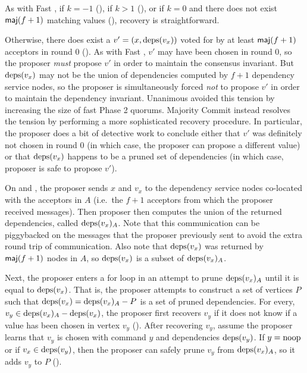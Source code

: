 As with Fast \BPaxos{}, if $k = -1$ (), if $k
> 1$ (), or if $k = 0$ and there does not exist
$\textsf{maj}(f+1)$ matching values (), recovery is
straightforward.

Otherwise, there does exist a $v' = (x, \text{deps}(v_x))$ voted for by at least
$\textsf{maj}(f+1)$ acceptors in round $0$ (). As with Fast
\BPaxos{}, $v'$ may have been chosen in round $0$, so the proposer \emph{must}
propose $v'$ in order to maintain the consensus invariant. But $\text{deps}(v_x)$ may
not be the union of dependencies computed by $f+1$ dependency service nodes, so
the proposer is simultaneously forced \emph{not} to propose $v'$ in order to
maintain the dependency invariant. Unanimous \BPaxos{} avoided this tension by
increasing the size of fast Phase 2 quorums.  Majority Commit \BPaxos{} instead
resolves the tension by performing a more sophisticated recovery procedure.  In
particular, the proposer does a bit of detective work to conclude either that
$v'$ was definitely not chosen in round $0$ (in which case, the proposer can
propose a different value) or that $\text{deps}(v_x)$ happens to be a pruned set of
dependencies (in which case, proposer is safe to propose $v'$).

On  and
, the proposer sends $x$ and $v_x$ to
the dependency service nodes co-located with the acceptors in $A$ (i.e.\ the
$f+1$ acceptors from which the proposer received  messages).
Then proposer then computes the union of the returned dependencies, called
$\text{deps}(v_x)_A$. Note that this communication can be piggybacked on the
 messages that the proposer previously sent to avoid the extra
round trip of communication.
%
Also note that $\text{deps}(v_x)$ was returned by $\textsf{maj}(f+1)$ nodes in $A$, so
$\text{deps}(v_x)$ is a subset of $\text{deps}(v_x)_A$.

Next, the proposer enters a for loop in an attempt to prune $\text{deps}(v_x)_A$
until it is equal to $\text{deps}(v_x)$. That is, the proposer attempts to construct
a set of vertices $P$ such that $\text{deps}(v_x) = \text{deps}(v_x)_A - P$ is a set of
pruned dependencies. For every, $v_y \in \text{deps}(v_x)_A - \text{deps}(v_x)$, the
proposer first recovers $v_y$ if it does not know if a value has been chosen in
vertex $v_y$ (). After recovering $v_y$, assume the
proposer learns that $v_y$ is chosen with command $y$ and dependencies
$\text{deps}(v_y)$. If $y = \text{noop}$ or if $v_x \in \text{deps}(v_y)$, then the proposer can
safely prune $v_y$ from $\text{deps}(v_x)_A$, so it adds $v_y$ to $P$
().


